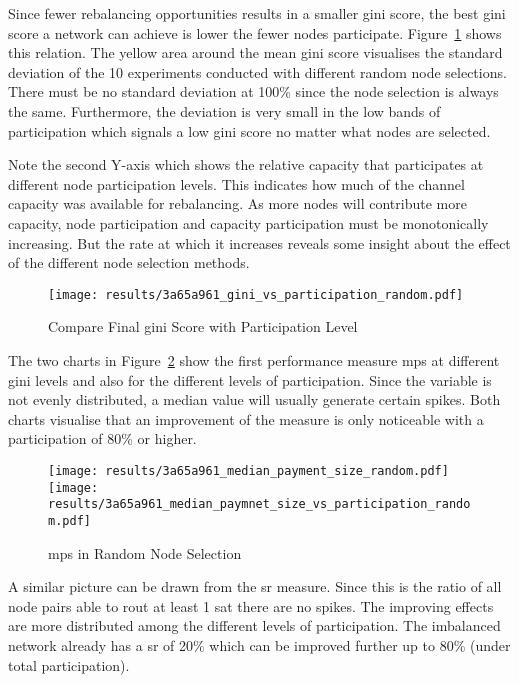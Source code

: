 \documentclass[final]{fhnwreport}       %
\begin{document}
Since fewer rebalancing opportunities results in a smaller \gls{gini} score, the best \gls{gini} score a network can achieve is lower the fewer nodes participate. Figure~\ref{fig:gini_part_rand} shows this relation. The yellow area around the mean \gls{gini} score visualises the standard deviation of the 10 experiments conducted with different random node selections. There must be no standard deviation at 100\% since the node selection is always the same. Furthermore, the deviation is very small in the low bands of participation which signals a low \gls{gini} score no matter what nodes are selected. 

Note the second Y-axis which shows the relative capacity that participates at different node participation levels. This indicates how much of the channel capacity was available for rebalancing. As more nodes will contribute more capacity, node participation and capacity participation must be monotonically increasing. But the rate at which it increases reveals some insight about the effect of the different node selection methods. 

\begin{figure}[H]
\centering
\texttt{[image: results/3a65a961\_gini\_vs\_participation\_random.pdf]}
\caption{Compare Final \gls{gini} Score with Participation Level}
\label{fig:gini_part_rand}
\end{figure}

The two charts in Figure~\ref{fig:pay_size_random} show the first performance measure \gls{mps} at different \gls{gini} levels and also for the different levels of participation. Since the variable is not evenly distributed, a median value will usually generate certain spikes. Both charts visualise that an improvement of the measure is only noticeable with a participation of 80\% or higher. 
\begin{figure}[htp]
\centering
\texttt{[image: results/3a65a961\_median\_payment\_size\_random.pdf]}\hfill
\texttt{[image: results/3a65a961\_median\_paymnet\_size\_vs\_participation\_random.pdf]}
\caption{\gls{mps} in Random Node Selection}
\label{fig:pay_size_random}
\end{figure}

A similar picture can be drawn from the \gls{sr} measure. Since this is the ratio of all node pairs able to rout at least 1 sat there are no spikes. The improving effects are more distributed among the different levels of participation. The imbalanced network already has a \gls{sr} of 20\% which can be improved further up to 80\% (under total participation).
\end{document}
